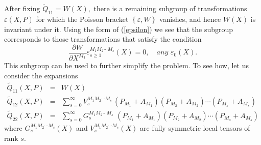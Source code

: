 \documentclass[a4paper,12pt]{article}
\begin{document}
After fixing $\tilde{Q}_{11}=W\left( X\right) ,$ there is a remaining
subgroup of transformations $\varepsilon \left( X,P\right) $ for which the
Poisson bracket $\left\{ \varepsilon ,W\right\} $ vanishes, and hence $%
W\left( X\right) $ is invariant under it. Using the form of (\ref{epsilon})
we see that the subgroup corresponds to those transformations that satisfy
the condition
\begin{equation}
\frac{\partial W}{\partial X^{M_{1}}}\varepsilon _{s\geq
1}^{M_{1}M_{2}\cdots M_{s}}\left( X\right) =0,\quad any\,\,\varepsilon
_{0}\left( X\right) .  \label{subgroup}
\end{equation}
This subgroup can be used to further simplify the problem. To see how, let
us consider the expansions
\begin{eqnarray}
\tilde{Q}_{11}\left( X,P\right) &=&W\left( X\right) \\
\tilde{Q}_{12}\left( X,P\right) &=&\sum_{s=0}^{\infty
}V_{s}^{M_{1}M_{2}\cdots M_{s}}\,\left( P_{M_{1}}+A_{M_{1}}\right) \left(
P_{M_{2}}+A_{M_{2}}\right) \cdots \left( P_{M_{s}}+A_{M_{s}}\right) \\
\tilde{Q}_{22}\left( X,P\right) &=&\sum_{s=0}^{\infty
}G_{s}^{M_{1}M_{2}\cdots M_{s}}\,\,\left( P_{M_{1}}+A_{M_{1}}\right) \left(
P_{M_{2}}+A_{M_{2}}\right) \cdots \left( P_{M_{s}}+A_{M_{s}}\right)
\end{eqnarray}
where $G_{s}^{M_{1}M_{2}\cdots M_{s}}\left( X\right) $ and $%
V_{s}^{M_{1}M_{2}\cdots M_{s}}\left( X\right) $ are fully symmetric local
tensors of rank $s.$
\end{document}
